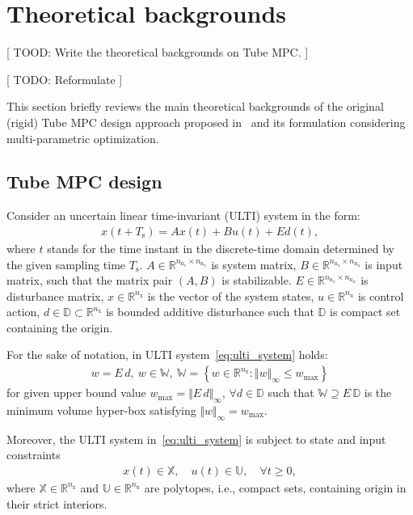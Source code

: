 \documentclass[letterpaper, 10 pt, conference]{ieeeconf}
\begin{document}
\section{Theoretical backgrounds}
\label{sec:tube_mpc_theory}

[ TOOD: Write the theoretical backgrounds on Tube MPC. ]

[ TODO: Reformulate ]

This section briefly reviews the main theoretical backgrounds of the original (rigid) Tube MPC design approach proposed in~\cite{MS05} and its formulation considering multi-parametric optimization.

\subsection{Tube MPC design}
\label{sec:tube_mpc}

Consider an uncertain linear time-invariant (ULTI) system in the form:
\begin{eqnarray}
	\label{eq:ulti_system}
	x(t+T_{\mathrm{s}}) = A x(t) + B u(t) + E d(t), %
\end{eqnarray}
where $t$ stands for the time instant in the discrete-time domain determined by the given sampling time $T_{\mathrm{s}}$. $A \in \mathbb{R}^{n_{\mathrm{n}_{x}} \times n_{\mathrm{n}_{x}}}$ is system matrix, $B \in \mathbb{R}^{n_{\mathrm{n}_{x}} \times n_{\mathrm{n}_{u}}}$ is input matrix, such that the matrix pair $(A,B)$ is stabilizable. $E \in \mathbb{R}^{n_{\mathrm{n}_{x}} \times n_{\mathrm{n}_{w}}}$ is disturbance matrix, $x \in \mathbb{R}^{n_{\mathrm{x}}}$ is the vector of the system states, $u \in \mathbb{R}^{n_{\mathrm{u}}}$ is control action, $d \in \mathbb{D} \subset \mathbb{R}^{n_{\mathrm{x}}}$ is bounded additive disturbance such that $\mathbb{D}$ is compact set containing the origin. 

For the sake of notation, in ULTI system~\eqref{eq:ulti_system} holds:
\begin{eqnarray}
	\label{eq:disturbance_set}
	w = E \, d, ~ w \in \mathbb{W}, ~ \mathbb{W} = \left\{ w \in \mathbb{R}^{n_{\mathrm{x}}} : \Vert w \Vert_{\infty} \leq w_{\max} \right\}
\end{eqnarray}
for given upper bound value $w_{\max} = \Vert E \, d \Vert_{\infty}$, $\forall d \in \mathbb{D}$ such that $\mathbb{W} \supseteq E \, \mathbb{D}$ is the minimum volume hyper-box satisfying $\Vert w \Vert_{\infty} = w_{\max}$.

Moreover, the ULTI system in~\eqref{eq:ulti_system} is subject to state and input constraints
\begin{eqnarray}
	\label{eq:constraints_x_u}
	x(t) \in \mathbb{X}, \quad u(t) \in \mathbb{U}, \quad \forall t \geq 0,
\end{eqnarray}
where $\mathbb{X} \in \mathbb{R}^{n_{\mathrm{x}}}$ and $\mathbb{U} \in \mathbb{R}^{n_{\mathrm{u}}}$ are polytopes, i.e., compact sets, containing origin in their strict interiors. 
\end{document}
